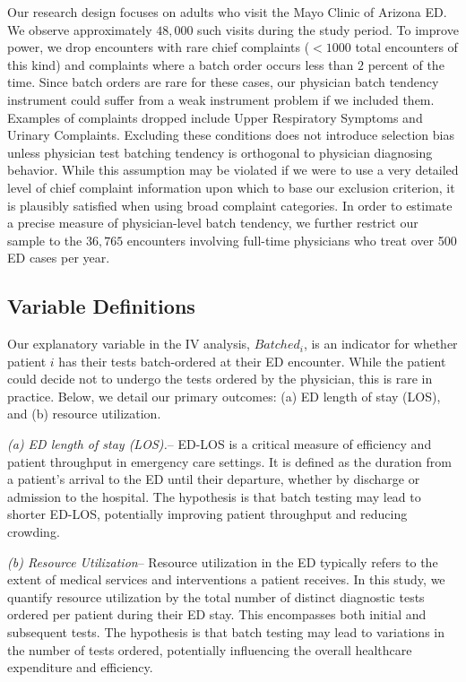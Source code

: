 \documentclass[,,nonblindrev]{informs}
\begin{document}
Our research design focuses on adults who visit the Mayo Clinic of
Arizona ED. We observe approximately \(48,000\) such visits during the
study period. To improve power, we drop encounters with rare chief
complaints (\(<1000\) total encounters of this kind) and complaints
where a batch order occurs less than \(2\) percent of the time. Since
batch orders are rare for these cases, our physician batch tendency
instrument could suffer from a weak instrument problem if we included
them. Examples of complaints dropped include Upper Respiratory Symptoms
and Urinary Complaints. Excluding these conditions does not introduce
selection bias unless physician test batching tendency is orthogonal to
physician diagnosing behavior. While this assumption may be violated if
we were to use a very detailed level of chief complaint information upon
which to base our exclusion criterion, it is plausibly satisfied when
using broad complaint categories. In order to estimate a precise measure
of physician-level batch tendency, we further restrict our sample to the
\(36,765\) encounters involving full-time physicians who treat over 500
ED cases per year.

\hypertarget{variable-definitions}{%
\subsection{Variable Definitions}\label{variable-definitions}}

Our explanatory variable in the IV analysis, \(Batched_i\), is an
indicator for whether patient \(i\) has their tests batch-ordered at
their ED encounter. While the patient could decide not to undergo the
tests ordered by the physician, this is rare in practice. Below, we
detail our primary outcomes: (a) ED length of stay (LOS), and (b)
resource utilization.

\emph{(a) ED length of stay (LOS).}-- ED-LOS is a critical measure of
efficiency and patient throughput in emergency care settings. It is
defined as the duration from a patient's arrival to the ED until their
departure, whether by discharge or admission to the hospital. The
hypothesis is that batch testing may lead to shorter ED-LOS, potentially
improving patient throughput and reducing crowding.

\emph{(b) Resource Utilization}-- Resource utilization in the ED
typically refers to the extent of medical services and interventions a
patient receives. In this study, we quantify resource utilization by the
total number of distinct diagnostic tests ordered per patient during
their ED stay. This encompasses both initial and subsequent tests. The
hypothesis is that batch testing may lead to variations in the number of
tests ordered, potentially influencing the overall healthcare
expenditure and efficiency.
\end{document}

